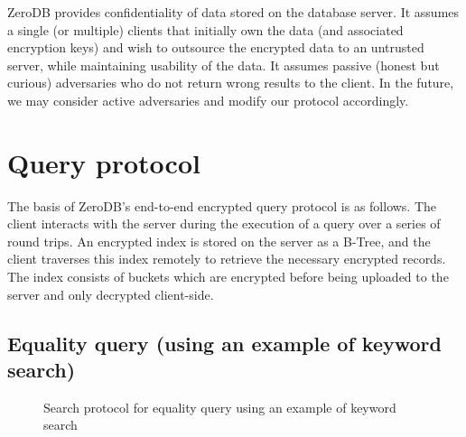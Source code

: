 \documentclass[notitlepage,longbibliography]{revtex4-1}
\begin{document}
ZeroDB provides confidentiality of data stored on the database server.
It assumes a single (or multiple) clients that initially own the data (and associated encryption keys) and wish to outsource the encrypted data to an untrusted server, while maintaining usability of the data.
It assumes passive (honest but curious) adversaries who do not return wrong results to the client.
In the future, we may consider active adversaries and modify our protocol accordingly.



\section{Query protocol}

The basis of ZeroDB's end-to-end encrypted query protocol is as follows.
The client interacts with the server during the execution of a query over a series of round trips.
An encrypted index is stored on the server as a B-Tree, and the client traverses this index remotely to retrieve the necessary encrypted records.
The index consists of buckets which are encrypted before being uploaded to the server and only decrypted client-side.

\subsection{Equality query (using an example of keyword search)}
\begin{figure}
	\begin{center}
        \qquad
	\end{center}
    \caption{Search protocol for equality query using an example of keyword search}
	\label{fig:btree-protocol}
\end{figure}
\end{document}
